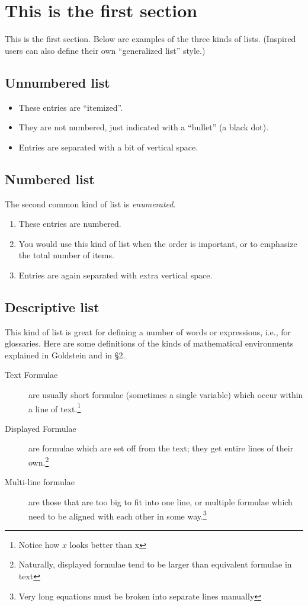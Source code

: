 \section{This is the first section}		%

This is the first section.
Below are examples of the three kinds of lists.
(Inspired users can also define their own
``generalized list'' style.)

\subsection{Unnumbered list}

\begin{itemize}
\item These entries are ``itemized''.
\item They are not numbered, just indicated with a ``bullet''
	(a black dot).
\item Entries are separated with a bit of vertical space.
\end{itemize}


\subsection{Numbered list}

The second common kind of list is {\em enumerated}.

\begin{enumerate}
\item These entries are numbered.
\item You would use this kind of list when the order is important,
	or to emphasize the total number of items.
\item Entries are again separated with extra vertical space.
\end{enumerate}


\subsection{Descriptive list}

This kind of list is great for defining
a number of words or expressions,
i.e., for glossaries.
Here are some definitions of the kinds of
mathematical environments
explained in Goldstein \cite{Gold3}
and in \S2.

\begin{description}
\item[Text Formulae]  are usually short formulae (sometimes a
	single variable) which occur within a line of
	text.\footnote{Notice how $x$ looks better than x}

\item[Displayed Formulae] are formulae which are set off from
	the text; they get entire lines of their
	own.\footnote{Naturally, displayed formulae tend
	to be larger than equivalent formulae in text}

\item[Multi-line formulae] are those that are too big to fit
	into one line, or multiple formulae which need to
	be aligned with each other in some
	way.\footnote{Very long equations must be
	broken into separate lines manually}
\end{description}


